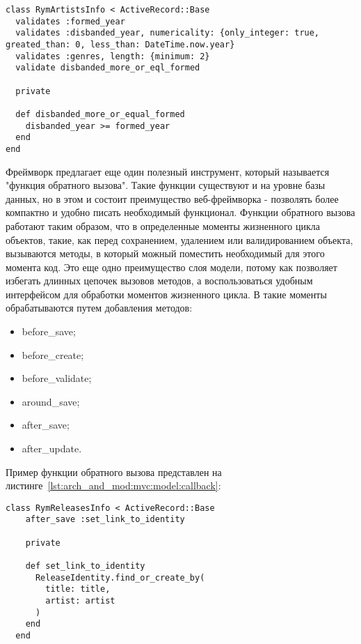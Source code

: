 \begin{lstlisting}[style=fsharpstyle,caption={Реализация валидации в классе RymArtistsInfo}, label=lst:arch_and_mod:mvc:model:rym_artists_info_validations]
class RymArtistsInfo < ActiveRecord::Base
  validates :formed_year
  validates :disbanded_year, numericality: {only_integer: true, greated_than: 0, less_than: DateTime.now.year}
  validates :genres, length: {minimum: 2}
  validate disbanded_more_or_eql_formed

  private

  def disbanded_more_or_equal_formed
    disbanded_year >= formed_year
  end
end
\end{lstlisting}

Фреймворк \ror{} предлагает еще один полезный инструмент, который называется "функция обратного вызова". Такие функции существуют и на уровне базы данных, но в этом и состоит преимущество веб-фреймворка - позволять более компактно и удобно писать необходимый функционал. Функции обратного вызова работают таким образом, что в определенные моменты жизненного цикла объектов, такие, как перед сохранением, удалением или валидированием объекта, вызываются методы, в который можный поместить необходимый для этого момента код. Это еще одно преимущество слоя модели, потому как позволяет избегать длинных цепочек вызовов методов, а воспользоваться удобным интерфейсом для обработки моментов жизненного цикла. В \ror{} такие моменты обрабатываются путем добавления методов:
\begin{itemize}
  \item before\_save;
  \item before\_create;
  \item before\_validate;
  \item around\_save;
  \item after\_save;
  \item after\_update.
\end{itemize}

Пример функции обратного вызова представлен на листинге~\ref{lst:arch_and_mod:mvc:model:callback}:

\begin{lstlisting}[style=fsharpstyle,caption={Пример получения артистов по определенным параметрам}, label=lst:arch_and_mod:mvc:model:callback]
  class RymReleasesInfo < ActiveRecord::Base
    after_save :set_link_to_identity

    private

    def set_link_to_identity
      ReleaseIdentity.find_or_create_by(
        title: title,
        artist: artist
      )
    end
  end
\end{lstlisting}

